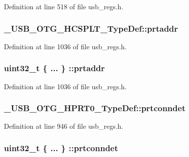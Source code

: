 Definition at line 518 of file usb\-\_\-regs.\-h.

\hypertarget{group___u_s_b___o_t_g___d_r_i_v_e_r_gacc448e71e7cef60de46bf9164a182940}{
\subsubsection[{prtaddr}]{ \-\_\-\-U\-S\-B\-\_\-\-O\-T\-G\-\_\-\-H\-C\-S\-P\-L\-T\-\_\-\-Type\-Def\-::prtaddr}}\label{group___u_s_b___o_t_g___d_r_i_v_e_r_gacc448e71e7cef60de46bf9164a182940}


Definition at line 1036 of file usb\-\_\-regs.\-h.

\hypertarget{group___u_s_b___o_t_g___d_r_i_v_e_r_ga14d8680d5b72b17d388c06815a9e1d16}{
\subsubsection[{prtaddr}]{\setlength{\rightskip}{0pt plus 5cm}uint32\-\_\-t \{ ... \} \-::prtaddr}}\label{group___u_s_b___o_t_g___d_r_i_v_e_r_ga14d8680d5b72b17d388c06815a9e1d16}


Definition at line 1036 of file usb\-\_\-regs.\-h.

\hypertarget{group___u_s_b___o_t_g___d_r_i_v_e_r_ga7c3212cf708588fcd8823f2fe4c171af}{
\subsubsection[{prtconndet}]{ \-\_\-\-U\-S\-B\-\_\-\-O\-T\-G\-\_\-\-H\-P\-R\-T0\-\_\-\-Type\-Def\-::prtconndet}}\label{group___u_s_b___o_t_g___d_r_i_v_e_r_ga7c3212cf708588fcd8823f2fe4c171af}


Definition at line 946 of file usb\-\_\-regs.\-h.

\hypertarget{group___u_s_b___o_t_g___d_r_i_v_e_r_gaf3fb4121bf2b171098f049dc309c4326}{
\subsubsection[{prtconndet}]{\setlength{\rightskip}{0pt plus 5cm}uint32\-\_\-t \{ ... \} \-::prtconndet}}\label{group___u_s_b___o_t_g___d_r_i_v_e_r_gaf3fb4121bf2b171098f049dc309c4326}


